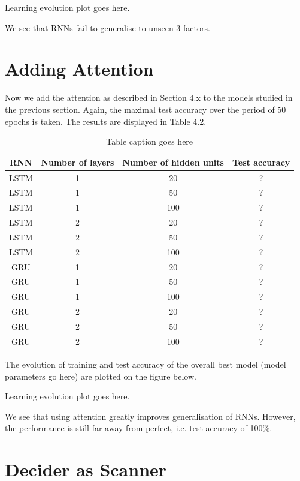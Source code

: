 \documentclass[titlepage]{report}
\newcommand{\otoprule}{\midrule[\heavyrulewidth]}
\begin{document}
\begin{center}
Learning evolution plot goes here.
\end{center}

We see that RNNs fail to generalise to unseen 3-factors.

\section{Adding Attention}

Now we add the attention as described in Section 4.x to the models studied in the previous section. Again, the maximal test accuracy over the period of 50 epochs is taken. The results are displayed in Table 4.2.

\begin{table}[H]
\caption{Table caption goes here}
\centering
\begin{tabular}{cccc}
\toprule%
\textbf{RNN} & \textbf{Number of layers} & \textbf{Number of hidden units} & \textbf{Test accuracy} \\
\otoprule%
LSTM & 1 & 20 & ? \\
LSTM & 1 & 50 & ? \\
LSTM & 1 & 100 & ? \\
LSTM & 2 & 20 & ? \\
LSTM & 2 & 50 & ? \\
LSTM & 2 & 100 & ? \\
GRU & 1 & 20 & ? \\ 
GRU & 1 & 50 & ? \\
GRU & 1 & 100 & ? \\
GRU & 2 & 20 & ? \\
GRU & 2 & 50 & ? \\
GRU & 2 & 100 & ? \\
\bottomrule
\end{tabular}
\label{table:nonlin}
\end{table}

The evolution of training and test accuracy of the overall best model (model parameters go here) are plotted on the figure below.

\begin{center}
Learning evolution plot goes here.
\end{center}

We see that using attention greatly improves generalisation of RNNs. However, the performance is still far away from perfect, i.e. test accuracy of 100\%.

\section{Decider as Scanner}
\end{document}
